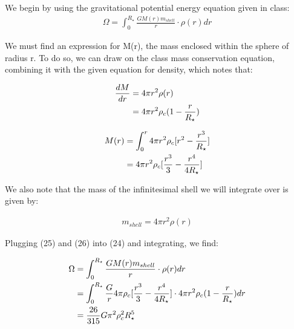 \documentclass[12pt]{article}
\newenvironment{answer}[2][Answer]{\begin{trivlist}
\item[\hskip \labelsep {\bfseries #1}\hskip \labelsep {\bfseries #2.}]}{\end{trivlist}}
\begin{document}
\begin{answer}{5}

We begin by using the gravitational potential energy equation given in class:
\begin{align}
  \Omega = \int_{0}^{R_{\star}} \frac{GM(r) m_{shell}}{r} \cdot \rho(r) dr
\end{align}

We must find an expression for M(r), the mass enclosed within the sphere of radius r. To do so, we can draw on the class mass conservation equation, combining it with the given equation for density, which notes that:

\begin{align}
  \frac{dM}{dr} &= 4 \pi r^2 \rho(r) \notag \\
                &= 4 \pi r^2 \rho_c(1 - \frac{r}{R_{\star}})
\end{align}

\begin{align}
  M(r) &= \int_{0}^{r} 4 \pi r^2 \rho_{c}[r^2 - \frac{r^3}{R_{\star}}] \notag \\
       &= 4\pi r^2 \rho_{c} [\frac{r^3}{3} - \frac{r^4}{4R_{\star}}]
\end{align}

We also note that the mass of the infinitesimal shell we will integrate over is given by:

\begin{align}
  m_{shell} = 4 \pi r^2 \rho(r)
\end{align}


Plugging (25) and (26) into (24) and integrating, we find:

\begin{align}
  \Omega &= \int_{0}^{R_{\star}} \frac{GM(r) m_{shell}}{r} \cdot \rho(r) dr \notag \\
         &= \int_{0}^{R_{\star}} \frac{G}{r} 4 \pi \rho_c [\frac{r^3}{3} - \frac{r^4}{4 R_{\star}}] \cdot 4\pi r^2 \rho_c (1 - \frac{r}{R_{\star}}) dr \\
         &= \frac{26}{315} G \pi^2 \rho_{c}^2 R_{\star}^5
\end{align}




\end{answer}
\end{document}
